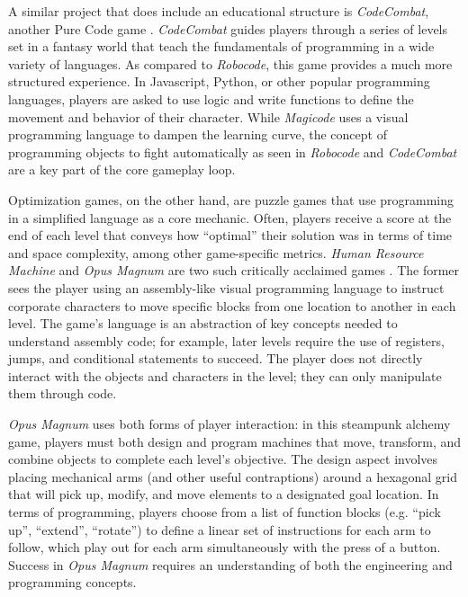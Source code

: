 \documentclass[10pt,twocolumn]{article}
\begin{document}
A similar project that does include an educational structure is \textit{CodeCombat}, another Pure Code game \cite{code-combat}. \textit{CodeCombat} guides players through a series of levels set in a fantasy world that teach the fundamentals of programming in a wide variety of languages. As compared to \textit{Robocode}, this game provides a much more structured experience. In Javascript, Python, or other popular programming languages, players are asked to use logic and write functions to define the movement and behavior of their character. While \textit{Magicode} uses a visual programming language to dampen the learning curve, the concept of programming objects to fight automatically as seen in \textit{Robocode} and \textit{CodeCombat} are a key part of the core gameplay loop.

Optimization games, on the other hand, are puzzle games that use programming in a simplified language as a core mechanic. Often, players receive a score at the end of each level that conveys how “optimal” their solution was in terms of time and space complexity, among other game-specific metrics. \textit{Human Resource Machine} and \textit{Opus Magnum} are two such critically acclaimed games \cite{human-resource-machine-steam} \cite{opus-magnum-steam}. The former sees the player using an assembly-like visual programming language to instruct corporate characters to move specific blocks from one location to another in each level. The game’s language is an abstraction of key concepts needed to understand assembly code; for example, later levels require the use of registers, jumps, and conditional statements to succeed. The player does not directly interact with the objects and characters in the level; they can only manipulate them through code.

\textit{Opus Magnum} uses both forms of player interaction: in this steampunk alchemy game, players must both design and program machines that move, transform, and combine objects to complete each level’s objective. The design aspect involves placing mechanical arms (and other useful contraptions) around a hexagonal grid that will pick up, modify, and move elements to a designated goal location. In terms of programming, players choose from a list of function blocks  (e.g. “pick up”, “extend”, “rotate”) to define a linear set of instructions for each arm to follow, which play out for each arm simultaneously with the press of a button. Success in \textit{Opus Magnum} requires an understanding of both the engineering and programming concepts. 
\end{document}
